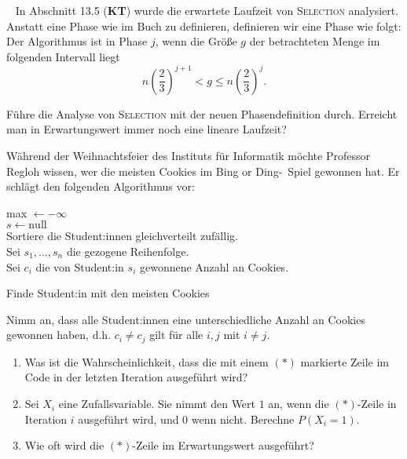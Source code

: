 \documentclass{uebung_cs}
\begin{document}
\begin{aufgabe}\
	In Abschnitt 13.5 (\textbf{KT}) wurde die erwartete Laufzeit von \textsc{Selection} analysiert.
	Anstatt eine Phase wie im Buch zu definieren, definieren wir eine Phase wie folgt:
	Der Algorithmus ist in Phase $j$, wenn die Größe $g$ der betrachteten Menge im folgenden Intervall liegt
	\[n\left(\frac{2}{3}\right)^{j+1} < g \leq n\left(\frac{2}{3}\right)^j. \]
	
	Führe die Analyse von \textsc{Selection} mit der neuen Phasendefinition durch. Erreicht man in Erwartungswert immer noch eine lineare Laufzeit?
\end{aufgabe}    

\begin{aufgabe}[Weihnachtsfeier im Institut]
	Während der Weihnachtsfeier des Instituts für Informatik möchte Professor Regloh wissen, wer die meisten Cookies im \glqq Bing or Ding\grqq{}-~Spiel gewonnen hat. Er schlägt den folgenden Algorithmus vor: 

	\begin{algorithm}[H]
		\SetAlgoLined
		max $\gets -\infty$\\
		$s \gets \text{null}$\\
		Sortiere die Student:innen gleichverteilt zufällig. \\
		Sei $s_1,\dots,s_n$ die gezogene Reihenfolge.\\
		Sei $c_i$ die von Student:in $s_i$ gewonnene Anzahl an Cookies.\\
		\caption{Finde Student:in mit den meisten Cookies}
\end{algorithm}
	
	Nimm an, dass alle Student:innen eine unterschiedliche Anzahl an Cookies gewonnen haben, d.h. $c_i \neq c_j$ gilt für alle $i,j$ mit $i \neq j$.
	\begin{enumerate}
		\item Was ist die Wahrscheinlichkeit, dass die mit einem $(\ast)$ markierte Zeile im Code in der letzten Iteration ausgeführt wird?
		\item Sei $X_i$ eine Zufallsvariable. Sie nimmt den Wert $1$ an, wenn die $(\ast)$-Zeile in Iteration $i$ ausgeführt wird, und $0$ wenn nicht. Berechne $P(X_i = 1)$.%
		\item Wie oft wird die $(\ast)$-Zeile im Erwartungswert ausgeführt?
	\end{enumerate}
\end{aufgabe}
\end{document}
